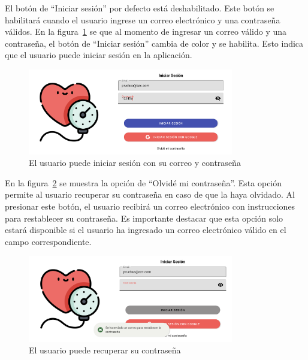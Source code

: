     El botón de ``Iniciar sesión'' por defecto está deshabilitado. Este botón se habilitará cuando el usuario ingrese un correo electrónico y una contraseña válidos. En la figura~\ref{fig:Android_IniciarSesionCorreo} se que al momento de ingresar un correo válido y una contraseña, el botón de ``Iniciar sesión'' cambia de color y se habilita. Esto indica que el usuario puede iniciar sesión en la aplicación.

    \begin{figure}[H]
        \centering
        \includegraphics[width=0.8\textwidth]{img/Resultados/android_iniciarSesionCorreo.png}
        \caption[El usuario puede iniciar sesión con su correo y contraseña.]{El usuario puede iniciar sesión con su correo y contraseña\footnotemark}
        \label{fig:Android_IniciarSesionCorreo}
    \end{figure}

    En la figura~\ref{fig:Android_RecuperarPassword} se muestra la opción de ``Olvidé mi contraseña''. Esta opción permite al usuario recuperar su contraseña en caso de que la haya olvidado. Al presionar este botón, el usuario recibirá un correo electrónico con instrucciones para restablecer su contraseña. Es importante destacar que esta opción solo estará disponible si el usuario ha ingresado un correo electrónico válido en el campo correspondiente.

    \begin{figure}[H]
        \centering
        \includegraphics[width=0.8\textwidth]{img/Resultados/android_olvidarPassword.png}
        \caption[El usuario puede recuperar su contraseña.]{El usuario puede recuperar su contraseña\footnotemark}
        \label{fig:Android_RecuperarPassword}
    \end{figure}

